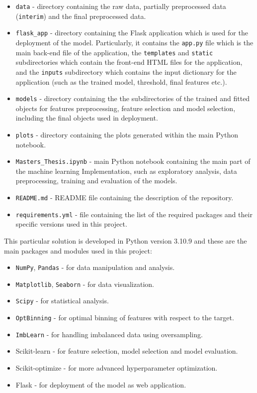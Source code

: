 \begin{itemize}\setlength\itemsep{0em}
\item \texttt{data} - directory containing the raw data, partially preprocessed data (\texttt{interim}) and the final preprocessed data.
\item \texttt{flask\_app} - directory containing the Flask application which is used for the deployment of the model. Particularly, it contains the \texttt{app.py} file which is the main back-end file of the application, the \texttt{templates} and \texttt{static} subdirectories which contain the front-end HTML files for the application, and the \texttt{inputs} subdirectory which contains the input dictionary for the application (such as the trained model, threshold, final features etc.).
\item \texttt{models} - directory containing the the subdirectories of the trained and fitted objects for features preprocessing, feature selection and model selection, including the final objects used in deployment.
\item \texttt{plots} - directory containing the plots generated within the main Python notebook.
\item \texttt{Masters\_Thesis.ipynb} - main Python notebook containing the main part of the machine learning Implementation, such as exploratory analysis, data preprocessing, training and evaluation of the models.
\item \texttt{README.md} - README file containing the description of the repository.
\item \texttt{requirements.yml} - file containing the list of the required packages and their specific versions used in this project.
\end{itemize}

This particular solution is developed in Python version 3.10.9 and these are the main packages and modules used in this project:
\begin{itemize}\setlength\itemsep{0em}
\item \lstinline{NumPy}, \lstinline{Pandas} - for data manipulation and analysis.
\item \lstinline{Matplotlib}, \lstinline{Seaborn} - for data visualization.
\item \lstinline{Scipy} - for statistical analysis.
\item \lstinline{OptBinning} - for optimal binning of features with respect to the target.
\item \lstinline{ImbLearn} - for handling imbalanced data using oversampling.
\item {Scikit-learn} - for feature selection, model selection and model evaluation.
\item {Scikit-optimize} - for more advanced hyperparameter optimization.
\item {Flask} - for deployment of the model as web application.
\end{itemize}


